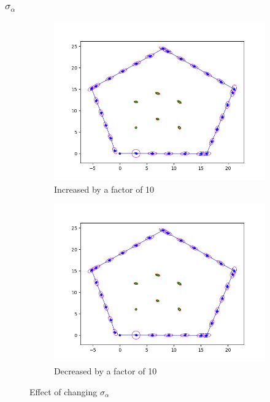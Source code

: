\documentclass[12pt, a4paper]{article}
\begin{document}
\subsubsection{$\sigma_{\alpha}$}
\begin{figure}[H]
  \centering
  \begin{subfigure}[b]{0.45\linewidth}
    \includegraphics[width=\linewidth]{./results/q3_2/result_alpha.png}
    \caption{Increased by a factor of 10}
  \end{subfigure}
  \hspace{0.5cm}
  \begin{subfigure}[b]{0.45\linewidth}
    \includegraphics[width=\linewidth]{./results/q3_2/result_alpha_dec.png}
    \caption{Decreased by a factor of 10}
  \end{subfigure}
  \caption{Effect of changing $\sigma_{\alpha}$}
\end{figure}
\end{document}
